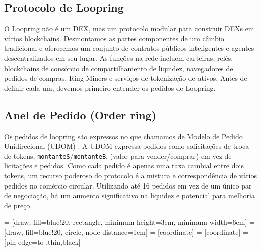 \documentclass[UTF8,nofonts]{article}
\makeatletter
\newenvironment{figurehere}
 {\def\@captype{figure}}
 {}
\makeatother
\begin{document}
\begin{multicols}{2}
\section{Protocolo de Loopring\label{sec:loopring_protocol}}
O Loopring não é um DEX, mas um protocolo modular para construir DEXs em vários blockchains. Desmontamos as partes componentes de um câmbio tradicional e oferecemos um conjunto de contratos públicos inteligentes e agentes descentralizados em seu lugar. As funções na rede incluem carteiras, relés, blockchains de consórcio de compartilhamento de liquidez, navegadores de pedidos de compras, Ring-Miners e serviços de tokenização de ativos. Antes de definir cada um, devemos primeiro entender os pedidos de Loopring.

\subsection{Anel de Pedido (Order ring)\label{sec:order_ring}}
Os pedidos de loopring são expressos no que chamamos de Modelo de Pedido Unidirecional (UDOM) \cite{coinport2014udom}. A UDOM expressa pedidos como solicitações de troca de tokens, \verb|montanteS|/\verb|montanteB|, (valor para vender/comprar) em vez de licitações e pedidos. Como cada pedido é apenas uma taxa cambial entre dois tokens, um recurso poderoso do protocolo é a mistura e correspondência de vários pedidos no comércio circular. Utilizando até 16 pedidos em vez de um único par de negociação, há um aumento significativo na liquidez e potencial para melhoria de preço.


\begin{center}
\begin{figurehere}
\centering
{} = [draw, fill=blue!20, rectangle, 
    minimum height=3em, minimum width=6em]
 = [draw, fill=blue!20, circle, node distance=1cm]
 = [coordinate]
 = [coordinate]
 = [pin edge={to-,thin,black}]

\end{figurehere}
\end{center}
\end{multicols}
\end{document}
